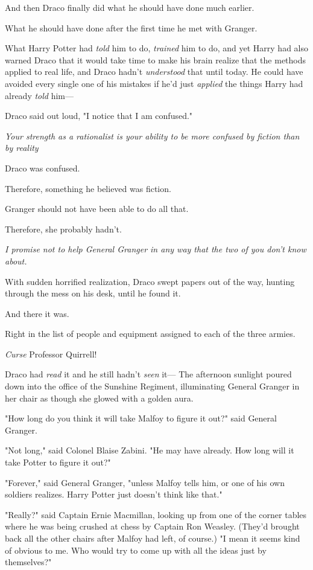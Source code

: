 And then Draco finally did what he should have done much earlier.

What he should have done after the first time he met with Granger.

What Harry Potter had \emph{told} him to do, \emph{trained} him to do, and yet
Harry had also warned Draco that it would take time to make his brain realize
that the methods applied to real life, and Draco hadn't \emph{understood} that
until today. He could have avoided every single one of his mistakes if he'd
just \emph{applied} the things Harry had already \emph{told} him—

Draco said out loud, "I notice that I am confused."

\emph{Your strength as a rationalist is your ability to be more confused by
fiction than by reality{\el}}

Draco was confused.

Therefore, something he believed was fiction.

Granger should not have been able to do all that.

Therefore, she probably hadn't.

\emph{I promise not to help General Granger in any way that the two of you
don't know about.}

With sudden horrified realization, Draco swept papers out of the way, hunting
through the mess on his desk, until he found it.

And there it was.

Right in the list of people and equipment assigned to each of the three armies.

\emph{Curse} Professor Quirrell!

Draco had \emph{read} it and he still hadn't \emph{seen} it—
\sbreak
The afternoon sunlight poured down into the office of the Sunshine Regiment,
illuminating General Granger in her chair as though she glowed with a golden
aura.

"How long do you think it will take Malfoy to figure it out?" said General
Granger.

"Not long," said Colonel Blaise Zabini. "He may have already. How long will it
take Potter to figure it out?"

"Forever," said General Granger, "unless Malfoy tells him, or one of his own
soldiers realizes. Harry Potter just doesn't think like that."

"Really?" said Captain Ernie Macmillan, looking up from one of the corner
tables where he was being crushed at chess by Captain Ron Weasley. (They'd
brought back all the other chairs after Malfoy had left, of course.) "I mean it
seems kind of obvious to me. Who would try to come up with all the ideas just
by themselves?"

